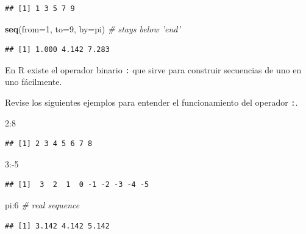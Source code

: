 \documentclass[10pt,]{krantz}
\makeatletter
\newenvironment{Shaded}{\begin{snugshade}}{\end{snugshade}}
\newcommand{\KeywordTok}[1]{\textcolor[rgb]{0.13,0.29,0.53}{\textbf{{#1}}}}
\newcommand{\DataTypeTok}[1]{\textcolor[rgb]{0.13,0.29,0.53}{{#1}}}
\newcommand{\DecValTok}[1]{\textcolor[rgb]{0.00,0.00,0.81}{{#1}}}
\newcommand{\CommentTok}[1]{\textcolor[rgb]{0.56,0.35,0.01}{\textit{{#1}}}}
\newcommand{\NormalTok}[1]{{#1}}
\let\proglang=\textsf
\newenvironment{kframe}{%
\medskip{}
\setlength{\fboxsep}{.8em}
 \def\at@end@of@kframe{}%
 \ifinner\ifhmode%
  \def\at@end@of@kframe{\end{minipage}}%
  \begin{minipage}{\columnwidth}%
 \fi\fi%
 \def\FrameCommand##1{\hskip\@totalleftmargin \hskip-\fboxsep
 \colorbox{shadecolor}{##1}\hskip-\fboxsep
     \hskip-\linewidth \hskip-\@totalleftmargin \hskip\columnwidth}%
 \MakeFramed {\advance\hsize-\width
   \@totalleftmargin\z@ \linewidth\hsize
   \@setminipage}}%
 {\par\unskip\endMakeFramed%
 \at@end@of@kframe}
\renewenvironment{Shaded}{\begin{kframe}}{\end{kframe}}
\let\BeginKnitrBlock\begin \let\EndKnitrBlock\end
\makeatother
\begin{document}
\begin{verbatim}
## [1] 1 3 5 7 9
\end{verbatim}

\begin{Shaded}
\begin{Highlighting}[]
\KeywordTok{seq}\NormalTok{(}\DataTypeTok{from=}\DecValTok{1}\NormalTok{, }\DataTypeTok{to=}\DecValTok{9}\NormalTok{, }\DataTypeTok{by=}\NormalTok{pi) }\CommentTok{# stays below 'end'}
\end{Highlighting}
\end{Shaded}

\begin{verbatim}
## [1] 1.000 4.142 7.283
\end{verbatim}

\BeginKnitrBlock{rmdnote}
En \proglang{R} existe el operador binario \texttt{:} que sirve para
construir secuencias de uno en uno fácilmente.
\EndKnitrBlock{rmdnote}

Revise los siguientes ejemplos para entender el funcionamiento del
operador \texttt{:}.

\begin{Shaded}
\begin{Highlighting}[]
\DecValTok{2}\NormalTok{:}\DecValTok{8}
\end{Highlighting}
\end{Shaded}

\begin{verbatim}
## [1] 2 3 4 5 6 7 8
\end{verbatim}

\begin{Shaded}
\begin{Highlighting}[]
\DecValTok{3}\NormalTok{:-}\DecValTok{5}
\end{Highlighting}
\end{Shaded}

\begin{verbatim}
## [1]  3  2  1  0 -1 -2 -3 -4 -5
\end{verbatim}

\begin{Shaded}
\begin{Highlighting}[]
\NormalTok{pi:}\DecValTok{6}  \CommentTok{# real sequence}
\end{Highlighting}
\end{Shaded}

\begin{verbatim}
## [1] 3.142 4.142 5.142
\end{verbatim}
\end{document}
